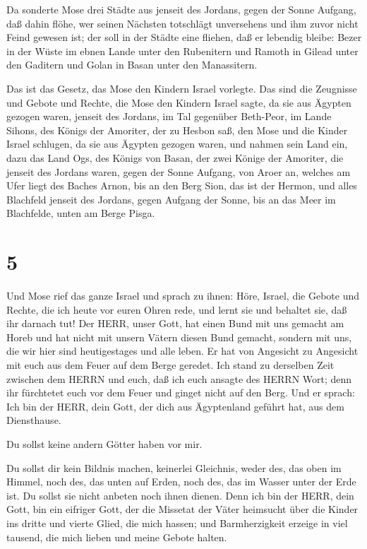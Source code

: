  Da sonderte Mose drei Städte aus jenseit des Jordans,
gegen der Sonne Aufgang,  daß dahin flöhe, wer seinen
Nächsten totschlägt unversehens und ihm zuvor nicht Feind gewesen ist;
der soll in der Städte eine fliehen, daß er lebendig bleibe:
 Bezer in der Wüste im ebnen Lande unter den Rubenitern und
Ramoth in Gilead unter den Gaditern und Golan in Basan unter den
Manassitern.

 Das ist das Gesetz, das Mose den Kindern Israel vorlegte.
 Das sind die Zeugnisse und Gebote und Rechte, die Mose den
Kindern Israel sagte, da sie aus Ägypten gezogen waren, 
jenseit des Jordans, im Tal gegenüber Beth-Peor, im Lande Sihons, des
Königs der Amoriter, der zu Hesbon saß, den Mose und die Kinder Israel
schlugen, da sie aus Ägypten gezogen waren,  und nahmen
sein Land ein, dazu das Land Ogs, des Königs von Basan, der zwei Könige
der Amoriter, die jenseit des Jordans waren, gegen der Sonne Aufgang,
 von Aroer an, welches am Ufer liegt des Baches Arnon, bis
an den Berg Sion, das ist der Hermon,  und alles Blachfeld
jenseit des Jordans, gegen Aufgang der Sonne, bis an das Meer im
Blachfelde, unten am Berge Pisga.

\hypertarget{section-4}{%
\section{5}\label{section-4}}

 Und Mose rief das ganze Israel und sprach zu ihnen: Höre,
Israel, die Gebote und Rechte, die ich heute vor euren Ohren rede, und
lernt sie und behaltet sie, daß ihr darnach tut!  Der HERR,
unser Gott, hat einen Bund mit uns gemacht am Horeb  und hat
nicht mit unsern Vätern diesen Bund gemacht, sondern mit uns, die wir
hier sind heutigestages und alle leben.  Er hat von
Angesicht zu Angesicht mit euch aus dem Feuer auf dem Berge geredet.
 Ich stand zu derselben Zeit zwischen dem HERRN und euch,
daß ich euch ansagte des HERRN Wort; denn ihr fürchtetet euch vor dem
Feuer und ginget nicht auf den Berg. Und er sprach:  Ich bin
der HERR, dein Gott, der dich aus Ägyptenland geführt hat, aus dem
Diensthause.

 Du sollst keine andern Götter haben vor mir.

 Du sollst dir kein Bildnis machen, keinerlei Gleichnis,
weder des, das oben im Himmel, noch des, das unten auf Erden, noch des,
das im Wasser unter der Erde ist.  Du sollst sie nicht
anbeten noch ihnen dienen. Denn ich bin der HERR, dein Gott, bin ein
eifriger Gott, der die Missetat der Väter heimsucht über die Kinder ins
dritte und vierte Glied, die mich hassen;  und
Barmherzigkeit erzeige in viel tausend, die mich lieben und meine Gebote
halten.

